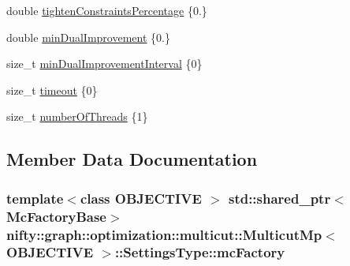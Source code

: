 \begin{DoxyCompactItemize}
\item 
double \hyperlink{structnifty_1_1graph_1_1optimization_1_1multicut_1_1MulticutMp_1_1SettingsType_a6d699ef7f55c1632833e7f81157ec8b0}{tighten\+Constraints\+Percentage} \{0.\}
\item 
double \hyperlink{structnifty_1_1graph_1_1optimization_1_1multicut_1_1MulticutMp_1_1SettingsType_a7875a7ca977e1f1565fa9836613b557b}{min\+Dual\+Improvement} \{0.\}
\item 
size\+\_\+t \hyperlink{structnifty_1_1graph_1_1optimization_1_1multicut_1_1MulticutMp_1_1SettingsType_aaf7cee9682acecf4aa7c000780883dcf}{min\+Dual\+Improvement\+Interval} \{0\}
\item 
size\+\_\+t \hyperlink{structnifty_1_1graph_1_1optimization_1_1multicut_1_1MulticutMp_1_1SettingsType_a7424b94936f0244e422dc1a54c69088e}{timeout} \{0\}
\item 
size\+\_\+t \hyperlink{structnifty_1_1graph_1_1optimization_1_1multicut_1_1MulticutMp_1_1SettingsType_a8b3689286b71bdfa11e0b5dc1c669ae4}{number\+Of\+Threads} \{1\}
\end{DoxyCompactItemize}


\subsection{Member Data Documentation}
\hypertarget{structnifty_1_1graph_1_1optimization_1_1multicut_1_1MulticutMp_1_1SettingsType_aef85a11dbd0c5177a3f96ea16ec0fb7f}{}
\subsubsection[{mc\+Factory}]{\setlength{\rightskip}{0pt plus 5cm}template$<$class O\+B\+J\+E\+C\+T\+I\+V\+E $>$ std\+::shared\+\_\+ptr$<${\bf Mc\+Factory\+Base}$>$ {\bf nifty\+::graph\+::optimization\+::multicut\+::\+Multicut\+Mp}$<$ O\+B\+J\+E\+C\+T\+I\+V\+E $>$\+::Settings\+Type\+::mc\+Factory}\label{structnifty_1_1graph_1_1optimization_1_1multicut_1_1MulticutMp_1_1SettingsType_aef85a11dbd0c5177a3f96ea16ec0fb7f}
\hypertarget{structnifty_1_1graph_1_1optimization_1_1multicut_1_1MulticutMp_1_1SettingsType_a7875a7ca977e1f1565fa9836613b557b}{}

